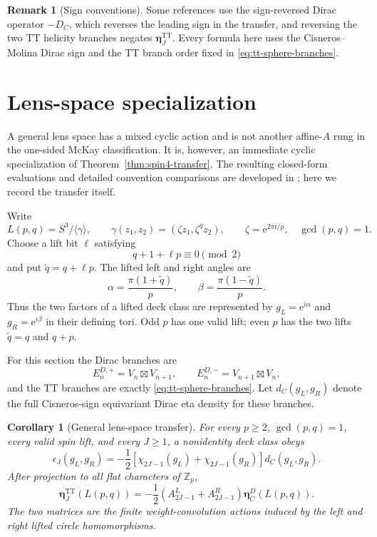 \documentclass[11pt]{article}
\newtheorem{corollary}[theorem]{Corollary}
\theoremstyle{definition}
\newtheorem{remark}[theorem]{Remark}
\newcommand{\TT}{\mathrm{TT}}
\newcommand{\Z}{\mathbb Z}
\newcommand{\e}{\mathrm e}
\begin{document}
\begin{remark}[Sign conventions]
Some references use the sign-reversed Dirac operator $-D_C$, which reverses
the leading sign in the transfer, and reversing the two TT helicity branches
negates $\boldsymbol\eta^{\TT}_J$.  Every formula here uses the
Cisneros--Molina Dirac sign and the TT branch order fixed in
\eqref{eq:tt-sphere-branches}.
\end{remark}

\section{Lens-space specialization}
\label{sec:general-lens}

A general lens space has a mixed cyclic action and is not another affine-$A$
rung in the one-sided McKay classification.  It is, however, an immediate
cyclic specialization of Theorem~\ref{thm:spin4-transfer}.  The resulting
closed-form evaluations and detailed convention comparisons are developed in
\cite{MahmoodP1Collection2026}; here we record the transfer itself.

Write
\[
 L(p,q)=S^3/\langle\gamma\rangle,\qquad
 \gamma(z_1,z_2)=(\zeta z_1,\zeta^qz_2),\qquad
 \zeta=\e^{2\pi i/p},\quad \gcd(p,q)=1.
\]
Choose a lift bit $\ell$ satisfying
\begin{equation}
 q+1+\ell p\equiv0\pmod2
 \label{eq:lens-lift-condition}
\end{equation}
and put $\widetilde q=q+\ell p$.  The lifted left and right angles are
\begin{equation}
 \alpha=\frac{\pi(1+\widetilde q)}p,\qquad
 \beta=\frac{\pi(1-\widetilde q)}p.
 \label{eq:lens-lift-angles}
\end{equation}
Thus the two factors of a lifted deck class are represented by
$g_L=\e^{i\alpha}$ and $g_R=\e^{i\beta}$ in their defining tori.  Odd $p$ has
one valid lift; even $p$ has the two lifts $\widetilde q=q$ and $q+p$.

For this section the Dirac branches are
\[
 E_n^{D,+}=V_n\boxtimes V_{n+1},\qquad
 E_n^{D,-}=V_{n+1}\boxtimes V_n,
\]
and the TT branches are exactly
\eqref{eq:tt-sphere-branches}.  Let $d_C(g_L,g_R)$ denote the full
Cisneros-sign equivariant Dirac eta density for these branches.

\begin{corollary}[General lens-space transfer]
\label{thm:general-lens-transfer}
For every $p\geq2$, $\gcd(p,q)=1$, every valid spin lift, and every
$J\geq1$, a nonidentity deck class obeys
\begin{equation}
 \boxed{
 \epsilon_J(g_L,g_R)
 =-\frac12\left[
   \chi_{2J-1}(g_L)+\chi_{2J-1}(g_R)
 \right]d_C(g_L,g_R).}
 \label{eq:general-lens-class-transfer}
\end{equation}
After projection to all flat characters of $\Z_p$,
\begin{equation}
 \boxed{
 \boldsymbol\eta^{\TT}_J(L(p,q))
 =-\frac12\left(A^L_{2J-1}+A^R_{2J-1}\right)
 \boldsymbol\eta^D_C(L(p,q)).}
 \label{eq:general-lens-vector-transfer}
\end{equation}
The two matrices are the finite weight-convolution actions induced by the
left and right lifted circle homomorphisms.
\end{corollary}
\end{document}
